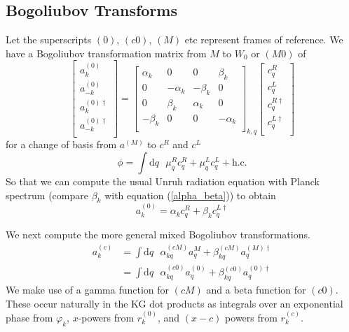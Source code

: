 \documentclass[12pt,a4paper]{article}
\newcommand{\dv}[1]{\mathrm{d} #1 \text{ }}
\begin{document}
\subsection{Bogoliubov Transforms}
Let the superscripts $(0)$, $(c0)$, $(M)$ etc represent frames of reference. We have a Bogoliubov transformation matrix from $M$ to $W_0$ or $(M0)$ of
\begin{equation}
  \left[ \begin{array}{l}
    a^{(0)}_k \\
    a^{(0)}_{-k} \\
    \hline
    a^{(0)\dagger}_k \\
    a^{(0)\dagger}_{-k} \\
 \end{array} \right] = 
  \left[
\begin{array}{rr|rr}
    \alpha_k &       0   &  0       & \beta_k \\
    0        & -\alpha_k & -\beta_k & 0 \\
    \hline
    0        & \beta_k   & \alpha_k & 0 \\
    -\beta_k &    0      &   0      & -\alpha_k \\
\end{array} \right]_{k,q}
\left[ \begin{array}{l}
    c^R_q \\
    c^L_q \\
    \hline
    c^{R\dagger}_q \\
    c^{L\dagger}_q \\
 \end{array} \right]
\end{equation}
for a change of basis from $a^{(M)}$ to $c^R$ and $c^L$
\begin{equation}
  \phi = \int \dv{q} \mu_q^R c_q^R + \mu_q^L c_q^L + \text{h.c.}
  \label{c_ladder}
\end{equation}
So that we can compute the usual Unruh radiation equation with Planck spectrum (compare $\beta_k$ with equation (\ref{alpha_beta})) to obtain
\begin{equation}
  a_k^{(0)} = \alpha_k c_q^R + \beta_k c_q^{L\dagger}
\label{a_in_c}
\end{equation}

We next compute the more general mixed Bogoliubov transformations.
\begin{equation}
  \begin{array}{ll}
  a^{(c)}_k &= \int \dv{q} \alpha^{(cM)}_{kq} a^{M}_q + \beta^{(cM)}_{kq} a^{(M)\dagger}_q \\
  &= \int \dv{q} \alpha^{(c0)}_{kq} a^{(0)}_q + \beta^{(c0)}_{kq} a^{(0)\dagger}_q
  \end{array}
\end{equation}
We make use of a gamma function for $(cM)$ and a beta function for $(c0)$. These occur naturally in the KG dot products as integrals over an exponential phase from $\varphi_k$, $x$-powers from $r_k^{(0)}$, and $(x-c)$ powers from $r_k^{(c)}$.
\end{document}
